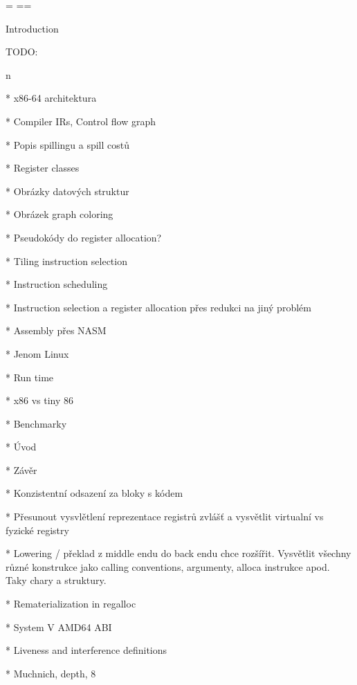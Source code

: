 {\nopagenumbers
  {\pgbackground={
    \picwidth=\pagewidth \picheight=\pageheight
    }
    \null\vfil\break}
  \null\vfil\break}
\makefront

\chap Introduction

TODO:

\begitems \style n

* x86-64 architektura

* Compiler IRs, Control flow graph

* Popis spillingu a spill costů

* Register classes

* Obrázky datových struktur

* Obrázek graph coloring

* Pseudokódy do register allocation?

* Tiling instruction selection

* Instruction scheduling

* Instruction selection a register allocation přes redukci na jiný problém

* Assembly přes NASM

* Jenom Linux

* Run time

* x86 vs tiny 86

* Benchmarky

* Úvod

* Závěr

* Konzistentní odsazení za bloky s kódem

* Přesunout vysvlětlení reprezentace registrů zvlášť a vysvětlit virtualní vs
fyzické registry

* Lowering / překlad z middle endu do back endu chce rozšířit. Vysvětlit všechny
různé konstrukce jako calling conventions, argumenty, alloca instrukce apod.
Taky chary a struktury.

* Rematerialization in regalloc

* System V AMD64 ABI

* Liveness and interference definitions

* Muchnich, depth, 8

\enditems

